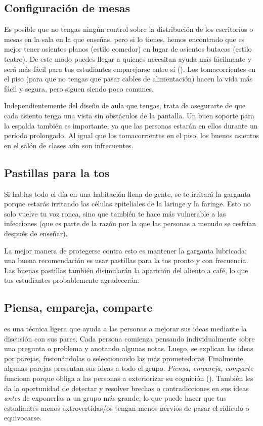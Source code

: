 \subsection*{Configuración de mesas}

Es posible que no tengas ningún control sobre la distribución de los escritorios o mesas
en la sala en la que enseñas,
pero si lo tienes,
hemos encontrado que es mejor tener asientos planos (estilo comedor)
en lugar de asientos butacas (estilo teatro).
De este modo puedes llegar a quienes necesitan ayuda más fácilmente
y será más fácil para tus estudiantes emparejarse entre sí ().
Los tomacorrientes en el piso (para que no tengas que pasar cables de alimentación)
hacen la vida más fácil y segura,
pero siguen siendo poco comunes.

Independientemente del diseño de aula que tengas,
trata de asegurarte de que cada asiento tenga una vista sin obstáculos de la pantalla.
Un buen soporte para la espalda también es importante,
ya que las personas estarán en ellos durante un período prolongado.
Al igual que los tomacorrientes en el piso,
los buenos asientos en el salón de clases aún son infrecuentes.

\subsection*{Pastillas para la tos}

Si hablas todo el día en una habitación llena de gente,
se te irritará la garganta porque estarás irritando las células epiteliales de la laringe y la faringe.
Esto no solo vuelve tu voz ronca, sino que también te hace más vulnerable a las infecciones
(que es parte de la razón por la que las personas a menudo se resfrían después de enseñar).

La mejor manera de protegerse contra esto es mantener la garganta lubricada:
una buena recomendación es usar pastillas para la tos pronto y con frecuencia.
Las buenas pastillas también disimularán la aparición del aliento a café,
lo que tus estudiantes probablemente agradecerán.

\subsection*{Piensa, empareja, comparte}

 es una técnica ligera
que ayuda a las personas a mejorar sus ideas
mediante la discusión con sus pares.
Cada persona comienza pensando individualmente sobre una pregunta o problema
y anotando algunas notas.
Luego, se explican las ideas por parejas,
fusionándolas o seleccionando las más prometedoras.
Finalmente,
algunas parejas presentan sus ideas a todo el grupo.
\emph{Piensa, empareja, comparte} funciona porque obliga a las personas a exteriorizar su cognición
().
También les da la oportunidad de detectar y resolver brechas o contradicciones en sus ideas
\emph{antes} de exponerlas a un grupo más grande,
lo que puede hacer que tus estudiantes menos extrovertidas/os tengan menos nervios de pasar el ridículo o equivocarse.

